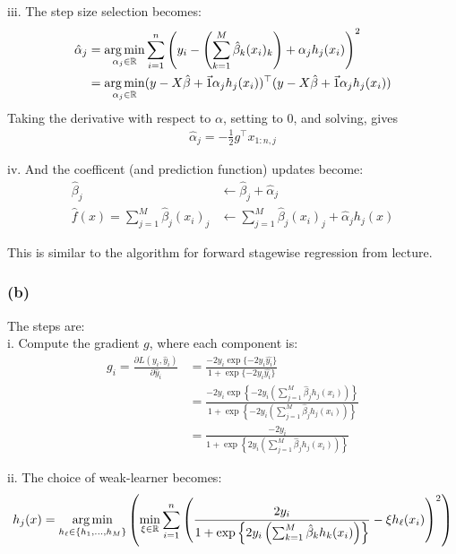 iii. The step size selection becomes:
\begin{align}
    \hat{\alpha}_j &= \operatorname*{arg\,min}_{\alpha_j \in \mathbb{R}}
    \sum_{i=1}^n \left( y_i - \left(\sum_{k=1}^M \hat{\beta}_k (x_i)_k \right)
        + \alpha_j h_j(x_i) \right)^2 \\
        &= \operatorname*{arg\,min}_{\alpha_j \in \mathbb{R}} (y - X \hat{\beta} +
        \vec{1}\alpha_j h_j(x_i))^{\top} (y - X \hat{\beta} + \vec{1}\alpha_j h_j(x_i))
\end{align}
Taking the derivative with respect to $\alpha$, setting to $0$, and solving, gives
\begin{align}
    \hat{\alpha}_j = -\frac{1}{2} g^{\top} x_{1:n,j}
\end{align}

iv. And the coefficent (and prediction function) updates become:
\begin{align}
    \hat{\beta}_j  &\leftarrow \hat{\beta}_j + \hat{\alpha}_j\\
    \hat{f}(x) = \sum_{j=1}^M \hat{\beta}_j (x_i)_j &\leftarrow
    \sum_{j=1}^M \hat{\beta}_j (x_i)_j
    + \hat{\alpha}_j h_j(x)
\end{align}

This is similar to the algorithm for forward stagewise regression from
lecture.

\subsubsection{(b)}
The steps are:\\
i. Compute the gradient $g$, where each component is:
\begin{align}
    g_i = \frac{\partial L(y_i,\hat{y}_i)}{\partial \hat{y}_i}
    &= \frac{-2 y_i \exp\{-2 y_i \hat{y_i}\}}
    {1 + \exp\{-2 y_i \hat{y_i}\}} \\
    &= \frac{-2 y_i \exp \left\{ -2 y_i \left(\sum_{j=1}^M
        \hat{\beta}_j h_j(x_i) \right)\right\}}
        {1 + \exp\left\{-2 y_i \left(\sum_{j=1}^M
            \hat{\beta}_j h_j(x_i) \right)\right\}}\\
    &= \frac{-2 y_i}
        {1 + \exp\left\{2 y_i \left(\sum_{j=1}^M
            \hat{\beta}_j h_j(x_i)
            \right) \right\} }
\end{align}

ii. The choice of weak-learner becomes:
\begin{align}
    h_j(x) = \operatorname*{arg\,min}_{h_{\ell} \in \{h_1,\ldots,h_M\}} \left( \min_{\xi \in
    \mathbb{R}} \sum_{i=1}^n \left( \frac{2 y_i}
        {1 + \exp\left\{2 y_i \left(\sum_{k=1}^M
                \hat{\beta}_k h_k(x_i) \right) \right\} } - \xi h_{\ell}(x_i)
                \right)^2 \right)
\end{align}

